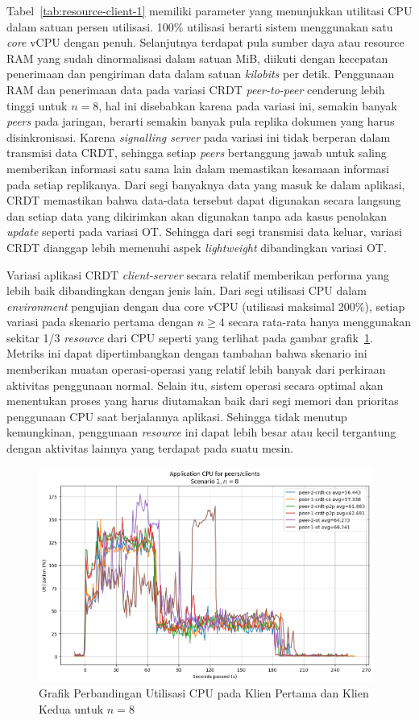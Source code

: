 Tabel~\ref{tab:resource-client-1} memiliki parameter yang menunjukkan utilitasi CPU dalam satuan persen utilisasi. 100\% utilisasi berarti sistem menggunakan satu \textit{core} vCPU dengan penuh. Selanjutnya terdapat pula sumber daya atau resource RAM yang sudah dinormalisasi dalam satuan MiB, diikuti dengan kecepatan penerimaan dan pengiriman data dalam satuan \textit{kilobits} per detik. Penggunaan RAM dan penerimaan data pada variasi CRDT \textit{peer-to-peer} cenderung lebih tinggi untuk $n = 8$, hal ini disebabkan karena pada variasi ini, semakin banyak \textit{peers} pada jaringan, berarti semakin banyak pula replika dokumen yang harus disinkronisasi. Karena \textit{signalling server} pada variasi ini tidak berperan dalam transmisi data CRDT, sehingga setiap \textit{peers} bertanggung jawab untuk saling memberikan informasi satu sama lain dalam memastikan kesamaan informasi pada setiap replikanya. Dari segi banyaknya data yang masuk ke dalam aplikasi, CRDT memastikan bahwa data-data tersebut dapat digunakan secara langsung dan setiap data yang dikirimkan akan digunakan tanpa ada kasus penolakan \textit{update} seperti pada variasi OT. Sehingga dari segi transmisi data keluar, variasi CRDT dianggap lebih memenuhi aspek \textit{lightweight} dibandingkan variasi OT.

Variasi aplikasi CRDT \textit{client-server} secara relatif memberikan performa yang lebih baik dibandingkan dengan jenis lain. Dari segi utilisasi CPU dalam \textit{environment} pengujian dengan dua core vCPU (utilisasi maksimal 200\%), setiap variasi pada skenario pertama dengan $n \geq 4$ secara rata-rata hanya menggunakan sekitar 1/3 \textit{resource} dari CPU seperti yang terlihat pada gambar grafik~\ref{fig:2-19}. Metriks ini dapat dipertimbangkan dengan tambahan bahwa skenario ini memberikan muatan operasi-operasi yang relatif lebih banyak dari perkiraan aktivitas penggunaan normal. Selain itu, sistem operasi secara optimal akan menentukan proses yang harus diutamakan baik dari segi memori dan prioritas penggunaan CPU saat berjalannya aplikasi. Sehingga tidak menutup kemungkinan, penggunaan \textit{resource} ini dapat lebih besar atau kecil tergantung dengan aktivitas lainnya yang terdapat pada suatu mesin.

\begin{figure}
 \centering
 \includegraphics[width=11cm]{./assets/skripsi/benchmark-vis_cell_2_output_19}
 \caption{Grafik Perbandingan Utilisasi CPU pada Klien Pertama dan Klien Kedua untuk $n = 8$}
 \label{fig:2-19}
\end{figure}

